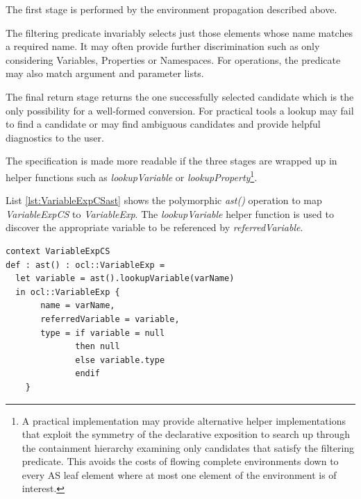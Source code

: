 \documentclass{llncs}
\begin{document}
The first stage is performed by the environment propagation described above.

The filtering predicate invariably selects just those elements whose name matches a required name. It may often provide further discrimination such as only considering Variables, Properties or Namespaces. For operations, the predicate may also match argument and parameter lists.

The final return stage returns the one successfully selected candidate which is the only possibility for a well-formed conversion. For practical tools a lookup may fail to find a candidate or may find ambiguous candidates and provide helpful diagnostics to the user. %

The specification is made more readable if the three stages are wrapped up in helper functions such as \emph{lookupVariable} or \emph{lookupProperty}\footnote{A practical implementation may provide alternative helper implementations that exploit the symmetry of the declarative exposition to search up through the containment hierarchy examining only candidates that satisfy the filtering predicate. This avoids the costs of flowing complete environments down to every AS leaf element where at most one element of the environment is of interest.}.

List \ref{lst:VariableExpCSast} shows the polymorphic \emph{ast()} operation to map \emph{VariableExpCS} to \emph{VariableExp}. The  \emph{lookupVariable} helper function is used to discover the appropriate variable to be referenced by \emph{referredVariable}.

\begin{lstlisting}[caption=CS2AS bridge for VariableExpCS to VariableExp, label=lst:VariableExpCSast, language=OCL]
context VariableExpCS
def : ast() : ocl::VariableExp =
  let variable = ast().lookupVariable(varName)
  in ocl::VariableExp {
       name = varName,
       referredVariable = variable,
       type = if variable = null
              then null
       	      else variable.type
       	      endif
   	}
\end{lstlisting}

	
\end{document}
